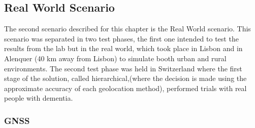 










\newpage
\subsection{Real World Scenario}
\label{subsec:real_world}
The second scenario described for this chapter is the Real World scenario. This scenario was separated in two test phases, the first one intended to test the results from the lab but in the real world, which took place in Lisbon and in Alenquer (40 km away from Lisbon) to simulate booth urban and rural environments. The second test phase was held in Switzerland where the first stage of the solution, called hierarchical,(where the decision is made using the approximate accuracy of each geolocation method), performed trials with real people with dementia. 

\subsubsection{GNSS}
\label{subsubsec:GNSS}

